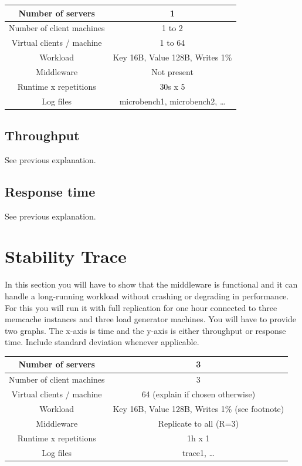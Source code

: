 \documentclass[11pt]{article}
\newcommand{\todo}[1]{\fcolorbox{black}{Apricot}{TODO: #1}}
\begin{document}
\small{
\smallskip
\begin{tabular}{|c|c|}
\hline Number of servers & 1 \\ 
\hline Number of client machines & 1 to 2 \\ 
\hline Virtual clients / machine & 1 to 64 \\ 
\hline Workload & Key 16B, Value 128B, Writes 1\% \footnotemark \\
\hline Middleware & Not present \\ 
\hline Runtime x repetitions & 30s x 5 \\ 
\hline Log files & microbench1, microbench2, \ldots \\
\hline 
\end{tabular} }





\subsection{Throughput}\label{sec:baseline:tput}
See previous explanation.
\subsection{Response time}\label{sec:baseline:rt}
See previous explanation.

\section{Stability Trace}\label{sec:trace}

\todo{}

In this section you will have to show that the middleware is functional and it can handle a long-running workload without crashing or degrading in performance. For this you will run it with full replication for one hour connected to three memcache instances and three load generator machines.
You will have to provide two graphs. The x-axis is time and the y-axis is either throughput or response time. Include standard deviation whenever applicable. 

\small{
\smallskip
\begin{tabular}{|c|c|}
\hline Number of servers & 3 \\ 
\hline Number of client machines & 3 \\ 
\hline Virtual clients / machine &  64 (explain if chosen otherwise) \\ 
\hline Workload & Key 16B, Value 128B, Writes 1\% (see footnote) \\
\hline Middleware & Replicate to all (R=3) \\ 
\hline Runtime x repetitions & 1h x 1 \\ 
\hline Log files & trace1, \ldots \\
\hline 
\end{tabular} }
\end{document}
